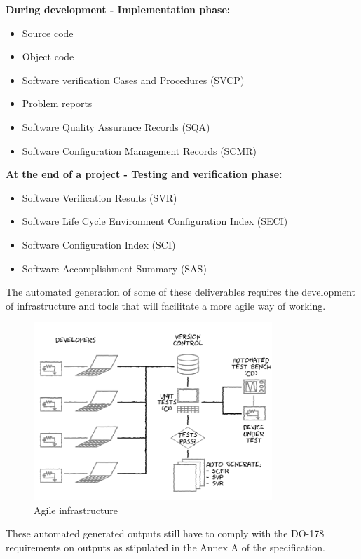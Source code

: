 \documentclass{sig-alternate-05-2015}
\begin{document}
\hfill \break
\textbf{During development - Implementation phase:}

\begin{itemize}
	\item Source code
	\item Object code
	\item Software verification Cases and Procedures (SVCP)
	\item Problem reports
	\item Software Quality Assurance Records (SQA)
	\item Software Configuration Management Records (SCMR)
\end{itemize}

\hfill \break
\textbf{At the end of a project - Testing and verification phase:}

\begin{itemize}
	\item Software Verification Results (SVR)
	\item Software Life Cycle Environment Configuration Index (SECI)
	\item Software Configuration Index (SCI)
	\item Software Accomplishment Summary (SAS)
\end{itemize} 

The automated generation of some of these deliverables requires the development of infrastructure and tools that will facilitate a more agile way of working.

\begin{figure}[t!]
	\centering 
	\includegraphics[width=90mm]{agile_setup.png}
	\caption{Agile infrastructure}
\end{figure}

These automated generated outputs still have to comply with the DO-178 requirements on outputs as stipulated in the Annex A of the specification.
\end{document}
